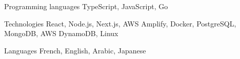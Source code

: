

\begin{cvskills}

  \cvskill
    {Programming languages} %
    {TypeScript, JavaScript, Go} %

  \cvskill
    {Technologies} %
    {React, Node.js, Next.js, AWS Amplify, Docker, PostgreSQL, MongoDB, AWS DynamoDB, Linux}  %

  \cvskill
    {Languages} %
    {French, English, Arabic, Japanese} %

\end{cvskills}
